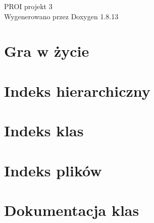 \documentclass[twoside]{book}
\newcommand{\+}{\discretionary{\mbox{\scriptsize$\hookleftarrow$}}{}{}}
\newcommand{\clearemptydoublepage}{%
  \newpage{\pagestyle{empty}\cleardoublepage}%
}
\begin{document}
\hypersetup{pageanchor=false,
             bookmarksnumbered=true,
             pdfencoding=unicode
            }
\begin{titlepage}
\vspace*{7cm}
\begin{center}%
{\Large P\+R\+OI projekt 3 }\\
\vspace*{1cm}
{\large Wygenerowano przez Doxygen 1.8.13}\\
\end{center}
\end{titlepage}
\clearemptydoublepage
{}
\tableofcontents
\clearemptydoublepage
{}
\hypersetup{pageanchor=true}

\chapter{Gra w życie}
\label{index}\hypertarget{index}{}
\chapter{Indeks hierarchiczny}

\chapter{Indeks klas}

\chapter{Indeks plików}

\chapter{Dokumentacja klas}



























\end{document}

